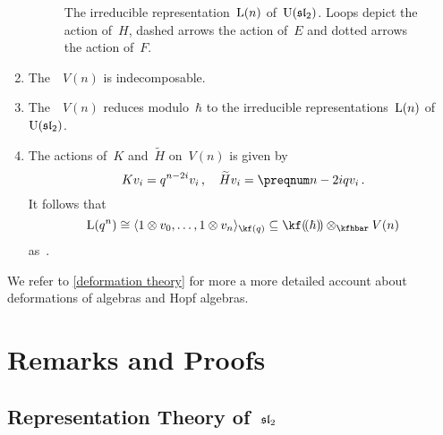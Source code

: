\documentclass[a4paper, 11pt, oneside]{scrartcl}
\begin{document}
\begin{theorem}
\begin{enumerate}
\begin{figure}
\begin{center}
        \end{center}
        \caption{%
          The irreducible representation~$\operatorname{L}(n)$ of~$\operatorname{U}(\mathfrak{sl}_2)$.
          Loops depict the action of~$H$, dashed arrows the action of~$E$ and dotted arrows the action of~$F$.
        }
        \label{graphical representation of deformed representations}
      \end{figure}
    \item
      The~~$V(n)$ is indecomposable.
    \item
      The~~$V(n)$ reduces modulo~$\hbar$ to the irreducible representations~$\operatorname{L}(n)$ of~$\operatorname{U}(\mathfrak{sl}_2)$.
    \item
      The actions of~$K$ and~$\widetilde{H}$ on~$V(n)$ is given by
      \[
        K v_i
        =
        q^{n - 2i} v_i \,,
        \quad
        \widetilde{H} v_i
        =
        \qnum{n - 2i} v_i \,.
      \]
      It follows that
      \[
        \irred(q^n)
        \cong
        \gen{1 \tensor v_0, \dotsc, 1 \tensor v_n}_{\kf(q)}
        \subseteq
        \lpower{\kf}{\hbar} \tensor_{\kfhbar} V(n)
      \]
      as~.
  \end{enumerate}
\end{theorem}

We refer to \cref{deformation theory} for more a more detailed account about deformations of algebras and Hopf algebras.





\newpage
\appendix





\section{Remarks and Proofs}



\subsection{Representation Theory of~$\mathfrak{sl}_2$}
\label{appendix representation theory of sl2}
\end{document}
